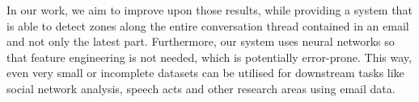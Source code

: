 \documentclass{llncs}
\begin{document}
In our work, we aim to improve upon those results, while providing a system that is able to detect zones along the entire conversation thread contained in an email and not only the latest part.
Furthermore, our system uses neural networks so that feature engineering is not needed, which is potentially error-prone.
This way, even very small or incomplete datasets can be utilised for downstream tasks like social network analysis, speech acts and other research areas using email data.











\end{document}
